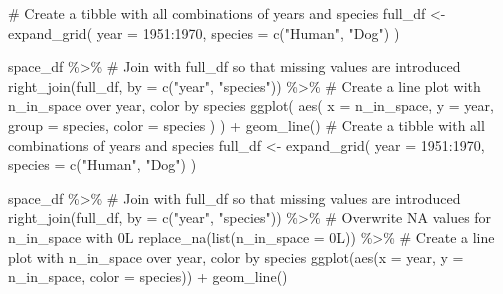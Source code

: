 \documentclass[
  letterpaper,
  DIV=11,
  numbers=noendperiod]{scrreprt}
\newenvironment{Shaded}{\begin{snugshade}}{\end{snugshade}}
\newcommand{\AttributeTok}[1]{\textcolor[rgb]{0.40,0.45,0.13}{#1}}
\newcommand{\CommentTok}[1]{\textcolor[rgb]{0.37,0.37,0.37}{#1}}
\newcommand{\DecValTok}[1]{\textcolor[rgb]{0.68,0.00,0.00}{#1}}
\newcommand{\FunctionTok}[1]{\textcolor[rgb]{0.28,0.35,0.67}{#1}}
\newcommand{\NormalTok}[1]{\textcolor[rgb]{0.00,0.23,0.31}{#1}}
\newcommand{\OtherTok}[1]{\textcolor[rgb]{0.00,0.23,0.31}{#1}}
\newcommand{\SpecialCharTok}[1]{\textcolor[rgb]{0.37,0.37,0.37}{#1}}
\newcommand{\StringTok}[1]{\textcolor[rgb]{0.13,0.47,0.30}{#1}}
\begin{document}
\begin{Shaded}
\begin{Highlighting}[]
\CommentTok{\# Create a tibble with all combinations of years and species}
\NormalTok{full\_df }\OtherTok{\textless{}{-}} \FunctionTok{expand\_grid}\NormalTok{(}
  \AttributeTok{year =} \DecValTok{1951}\SpecialCharTok{:}\DecValTok{1970}\NormalTok{, }
  \AttributeTok{species =} \FunctionTok{c}\NormalTok{(}\StringTok{"Human"}\NormalTok{, }\StringTok{"Dog"}\NormalTok{)}
\NormalTok{)}

\NormalTok{space\_df }\SpecialCharTok{\%\textgreater{}\%} 
  \CommentTok{\# Join with full\_df so that missing values are introduced}
  \FunctionTok{right\_join}\NormalTok{(full\_df, }\AttributeTok{by =} \FunctionTok{c}\NormalTok{(}\StringTok{"year"}\NormalTok{, }\StringTok{"species"}\NormalTok{)) }\SpecialCharTok{\%\textgreater{}\%} 
  \CommentTok{\# Create a line plot with n\_in\_space over year, color by species}
  \FunctionTok{ggplot}\NormalTok{(}
    \FunctionTok{aes}\NormalTok{(}
      \AttributeTok{x =}\NormalTok{ n\_in\_space,}
      \AttributeTok{y =}\NormalTok{ year,}
      \AttributeTok{group =}\NormalTok{ species,}
      \AttributeTok{color =}\NormalTok{ species}
\NormalTok{    )}
\NormalTok{  ) }\SpecialCharTok{+}
  \FunctionTok{geom\_line}\NormalTok{()}
\CommentTok{\# Create a tibble with all combinations of years and species}
\NormalTok{full\_df }\OtherTok{\textless{}{-}} \FunctionTok{expand\_grid}\NormalTok{(}
  \AttributeTok{year =} \DecValTok{1951}\SpecialCharTok{:}\DecValTok{1970}\NormalTok{, }
  \AttributeTok{species =} \FunctionTok{c}\NormalTok{(}\StringTok{"Human"}\NormalTok{, }\StringTok{"Dog"}\NormalTok{)}
\NormalTok{)}

\NormalTok{space\_df }\SpecialCharTok{\%\textgreater{}\%} 
  \CommentTok{\# Join with full\_df so that missing values are introduced}
  \FunctionTok{right\_join}\NormalTok{(full\_df, }\AttributeTok{by =} \FunctionTok{c}\NormalTok{(}\StringTok{"year"}\NormalTok{, }\StringTok{"species"}\NormalTok{)) }\SpecialCharTok{\%\textgreater{}\%} 
  \CommentTok{\# Overwrite NA values for n\_in\_space with 0L}
  \FunctionTok{replace\_na}\NormalTok{(}\FunctionTok{list}\NormalTok{(}\AttributeTok{n\_in\_space =}\NormalTok{ 0L)) }\SpecialCharTok{\%\textgreater{}\%} 
  \CommentTok{\# Create a line plot with n\_in\_space over year, color by species}
  \FunctionTok{ggplot}\NormalTok{(}\FunctionTok{aes}\NormalTok{(}\AttributeTok{x =}\NormalTok{ year, }\AttributeTok{y =}\NormalTok{ n\_in\_space, }\AttributeTok{color =}\NormalTok{ species)) }\SpecialCharTok{+}
  \FunctionTok{geom\_line}\NormalTok{()}
\end{Highlighting}
\end{Shaded}
\end{document}

